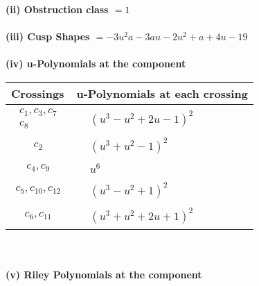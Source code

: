 \documentclass[1p]{elsarticle_modified}
\theoremstyle{definition}
\begin{document}
\flushleft \textbf{(ii) Obstruction class $= 1$}\\~\\
\flushleft \textbf{(iii) Cusp Shapes $= -3 u^2 a-3 a u-2 u^2+a+4 u-19$}\\~\\
\newpage\renewcommand{\arraystretch}{1}
\flushleft \textbf{(iv) u-Polynomials at the component}\newline \\
\begin{tabular}{m{50pt}|m{274pt}}
Crossings & \hspace{64pt}u-Polynomials at each crossing \\
\hline $$\begin{aligned}c_{1},c_{3},c_{7}\\c_{8}\end{aligned}$$&$\begin{aligned}
&(u^3- u^2+2 u-1)^2
\end{aligned}$\\
\hline $$\begin{aligned}c_{2}\end{aligned}$$&$\begin{aligned}
&(u^3+u^2-1)^2
\end{aligned}$\\
\hline $$\begin{aligned}c_{4},c_{9}\end{aligned}$$&$\begin{aligned}
&u^6
\end{aligned}$\\
\hline $$\begin{aligned}c_{5},c_{10},c_{12}\end{aligned}$$&$\begin{aligned}
&(u^3- u^2+1)^2
\end{aligned}$\\
\hline $$\begin{aligned}c_{6},c_{11}\end{aligned}$$&$\begin{aligned}
&(u^3+u^2+2 u+1)^2
\end{aligned}$\\
\hline
\end{tabular}\\~\\
\newpage\renewcommand{\arraystretch}{1}
\flushleft \textbf{(v) Riley Polynomials at the component}\newline \\
\end{document}
